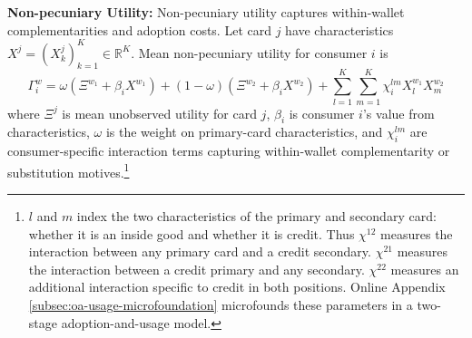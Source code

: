 \documentclass[main.tex]{subfiles}
\begin{document}
\noindent \textbf{Non-pecuniary Utility:}\hspace{0.2in} Non-pecuniary utility captures within-wallet complementarities and adoption costs.
Let card $j$ have characteristics $X^j=\left(X^j_k\right)_{k=1}^{K}\in\mathbb{R}^K$.
Mean non-pecuniary utility for consumer $i$ is
\begin{equation}
  \Gamma_{i}^{w}=\omega\left(\Xi^{w_{1}}+\beta_{i}X^{w_{1}}\right)+\left(1-\omega\right)\left(\Xi^{w_{2}}+\beta_{i}X^{w_{2}}\right)+\sum_{l=1}^{K}\sum_{m=1}^{K}\chi^{lm}_{i}X_{l}^{w_{1}}X_{m}^{w_{2}} \label{eq:nonpecuniary-definition}
\end{equation}
where $\Xi^{j}$ is mean unobserved utility for card $j$, $\beta_i$ is consumer $i$'s value from characteristics, $\omega$ is the weight on primary-card characteristics, and $\chi^{lm}_{i}$ are consumer-specific interaction terms capturing within-wallet complementarity or substitution motives.\footnote{
  $l$ and $m$ index the two characteristics of the primary and secondary card: whether it is an inside good and whether it is credit.
  Thus $\chi^{12}$ measures the interaction between any primary card and a credit secondary. $\chi^{21}$ measures the interaction between a credit primary and any secondary. $\chi^{22}$ measures an additional interaction specific to credit in both positions.
  Online Appendix \ref{subsec:oa-usage-microfoundation} microfounds these parameters in a two-stage adoption-and-usage model.
}
\end{document}
